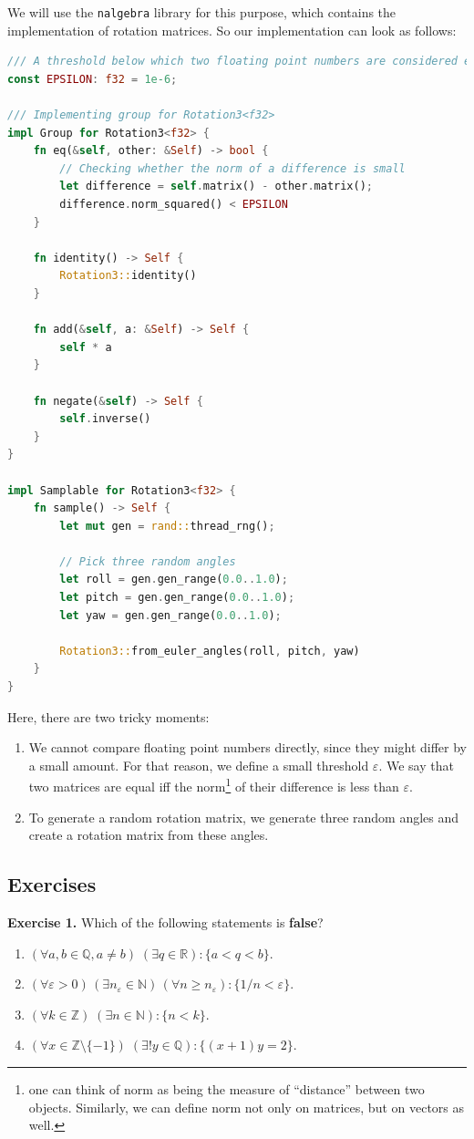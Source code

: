 \documentclass[../lecture-notes.tex]{subfiles}
\begin{document}
We will use the \texttt{nalgebra} library for this purpose, which contains the implementation of rotation matrices. So our implementation can look as follows:
\begin{lstlisting}[language=Rust]
/// A threshold below which two floating point numbers are considered equal.
const EPSILON: f32 = 1e-6;

/// Implementing group for Rotation3<f32>
impl Group for Rotation3<f32> {
    fn eq(&self, other: &Self) -> bool {
        // Checking whether the norm of a difference is small
        let difference = self.matrix() - other.matrix();
        difference.norm_squared() < EPSILON
    }

    fn identity() -> Self {
        Rotation3::identity()
    }

    fn add(&self, a: &Self) -> Self {
        self * a
    }

    fn negate(&self) -> Self {
        self.inverse()
    }
}

impl Samplable for Rotation3<f32> {
    fn sample() -> Self {
        let mut gen = rand::thread_rng();

        // Pick three random angles
        let roll = gen.gen_range(0.0..1.0);
        let pitch = gen.gen_range(0.0..1.0);
        let yaw = gen.gen_range(0.0..1.0);

        Rotation3::from_euler_angles(roll, pitch, yaw)
    }
}
\end{lstlisting}

Here, there are two tricky moments:
\begin{enumerate}
    \item We cannot compare floating point numbers directly, since they might differ by a small amount. For that reason, we define a small threshold $\varepsilon$. We say that two matrices are equal iff the norm\footnote{one can think of norm as being the measure of ``distance'' between two objects. Similarly, we can define norm not only on matrices, but on vectors as well.} of their difference is less than $\varepsilon$.
    \item To generate a random rotation matrix, we generate three random angles and create a rotation matrix from these angles.
\end{enumerate}

\newpage
\subsection{Exercises}

\textbf{Exercise 1.} Which of the following statements is \textbf{false}?
\begin{enumerate}
    \item $(\forall a, b \in \mathbb{Q}, a \neq b) \; (\exists q \in \mathbb{R}): \{a < q < b\}$.
    \item $(\forall \varepsilon > 0) \, (\exists n_{\varepsilon} \in \mathbb{N}) \, (\forall n \geq n_{\varepsilon}): \{1/n < \varepsilon\}$.
    \item $(\forall k \in \mathbb{Z}) \; (\exists n \in \mathbb{N}): \{n < k\}$.
    \item $(\forall x \in \mathbb{Z} \setminus \{-1\}) \; (\exists! y \in \mathbb{Q}): \{(x+1)y = 2\}$.
\end{enumerate}
\end{document}
